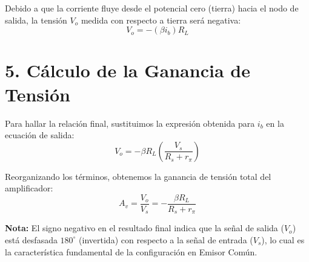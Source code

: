 \documentclass[12pt, a4paper]{article}
\begin{document}
Debido a que la corriente fluye desde el potencial cero (tierra) hacia el nodo de salida, la tensión $V_o$ medida con respecto a tierra será negativa:
\begin{equation}
    V_o = - (\beta i_b) R_L
\end{equation}

\section*{5. Cálculo de la Ganancia de Tensión}
Para hallar la relación final, sustituimos la expresión obtenida para $i_b$ en la ecuación de salida:
\begin{equation*}
    V_o = - \beta R_L \left( \frac{V_s}{R_s + r_\pi} \right)
\end{equation*}

Reorganizando los términos, obtenemos la ganancia de tensión total del amplificador:
\begin{equation}
    A_v = \frac{V_o}{V_s} = - \frac{\beta R_L}{R_s + r_\pi}
\end{equation}

\textbf{Nota:} El signo negativo en el resultado final indica que la señal de salida ($V_o$) está desfasada $180^\circ$ (invertida) con respecto a la señal de entrada ($V_s$), lo cual es la característica fundamental de la configuración en Emisor Común.
\end{document}
